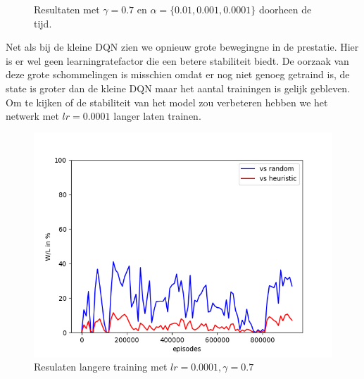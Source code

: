 \documentclass[11pt]{article}
\begin{document}
\begin{figure}[H]
    \centering
    \qquad
    \caption{Resultaten met $\gamma = 0.7$ en $\alpha = \{0.01, 0.001, 0.0001\}$ doorheen de tijd.}
\end{figure}
\noindent Net als bij de kleine DQN zien we opnieuw grote bewegingne in de prestatie. Hier is er wel geen learningratefactor die een betere stabiliteit biedt. De oorzaak van deze grote schommelingen is misschien omdat er nog niet genoeg getraind is, de state is groter dan de kleine DQN maar het aantal trainingen is gelijk gebleven. Om te kijken of de stabiliteit van het model zou verbeteren hebben we het netwerk met $ lr = 0.0001$ langer laten trainen.
\begin{figure}[H]
\centering
\includegraphics[scale=0.45]{images/big_dqn_extended_training.png}
\caption{Resulaten langere training met $lr = 0.0001, \gamma = 0.7$}
\end{figure}
\end{document}
